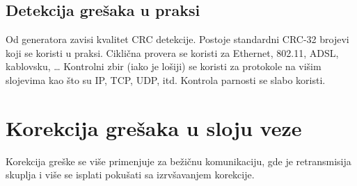 \documentclass[a4paper]{article}
\begin{document}
\subsection{Detekcija grešaka u praksi}
    Od generatora zavisi kvalitet CRC detekcije. Postoje standardni CRC-32 brojevi koji se koristi
    u praksi. Ciklična provera se koristi za Ethernet, 802.11, ADSL, kablovsku, \dots
    Kontrolni zbir (iako je lošiji) se koristi za protokole na višim slojevima kao što su IP, TCP,
    UDP, itd. Kontrola parnosti se slabo koristi.
    
\section{Korekcija grešaka u sloju veze}
    Korekcija greške se više primenjuje za bežičnu komunikaciju, gde je retransmisija skuplja i
    više se isplati pokušati sa izrvšavanjem korekcije.
\end{document}
